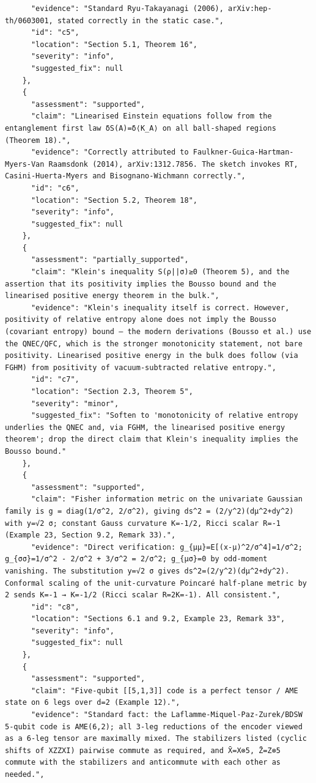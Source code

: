 \documentclass[11pt]{article}
\begin{document}
\begin{verbatim}
      "evidence": "Standard Ryu-Takayanagi (2006), arXiv:hep-th/0603001, stated correctly in the static case.",
      "id": "c5",
      "location": "Section 5.1, Theorem 16",
      "severity": "info",
      "suggested_fix": null
    },
    {
      "assessment": "supported",
      "claim": "Linearised Einstein equations follow from the entanglement first law δS(A)=δ⟨K_A⟩ on all ball-shaped regions (Theorem 18).",
      "evidence": "Correctly attributed to Faulkner-Guica-Hartman-Myers-Van Raamsdonk (2014), arXiv:1312.7856. The sketch invokes RT, Casini-Huerta-Myers and Bisognano-Wichmann correctly.",
      "id": "c6",
      "location": "Section 5.2, Theorem 18",
      "severity": "info",
      "suggested_fix": null
    },
    {
      "assessment": "partially_supported",
      "claim": "Klein's inequality S(ρ||σ)≥0 (Theorem 5), and the assertion that its positivity implies the Bousso bound and the linearised positive energy theorem in the bulk.",
      "evidence": "Klein's inequality itself is correct. However, positivity of relative entropy alone does not imply the Bousso (covariant entropy) bound — the modern derivations (Bousso et al.) use the QNEC/QFC, which is the stronger monotonicity statement, not bare positivity. Linearised positive energy in the bulk does follow (via FGHM) from positivity of vacuum-subtracted relative entropy.",
      "id": "c7",
      "location": "Section 2.3, Theorem 5",
      "severity": "minor",
      "suggested_fix": "Soften to 'monotonicity of relative entropy underlies the QNEC and, via FGHM, the linearised positive energy theorem'; drop the direct claim that Klein's inequality implies the Bousso bound."
    },
    {
      "assessment": "supported",
      "claim": "Fisher information metric on the univariate Gaussian family is g = diag(1/σ^2, 2/σ^2), giving ds^2 = (2/y^2)(dμ^2+dy^2) with y=√2 σ; constant Gauss curvature K=-1/2, Ricci scalar R=-1 (Example 23, Section 9.2, Remark 33).",
      "evidence": "Direct verification: g_{μμ}=E[(x-μ)^2/σ^4]=1/σ^2; g_{σσ}=1/σ^2 - 2/σ^2 + 3/σ^2 = 2/σ^2; g_{μσ}=0 by odd-moment vanishing. The substitution y=√2 σ gives ds^2=(2/y^2)(dμ^2+dy^2). Conformal scaling of the unit-curvature Poincaré half-plane metric by 2 sends K=-1 → K=-1/2 (Ricci scalar R=2K=-1). All consistent.",
      "id": "c8",
      "location": "Sections 6.1 and 9.2, Example 23, Remark 33",
      "severity": "info",
      "suggested_fix": null
    },
    {
      "assessment": "supported",
      "claim": "Five-qubit [[5,1,3]] code is a perfect tensor / AME state on 6 legs over d=2 (Example 12).",
      "evidence": "Standard fact: the Laflamme-Miquel-Paz-Zurek/BDSW 5-qubit code is AME(6,2); all 3-leg reductions of the encoder viewed as a 6-leg tensor are maximally mixed. The stabilizers listed (cyclic shifts of XZZXI) pairwise commute as required, and X̄=X⊗5, Z̄=Z⊗5 commute with the stabilizers and anticommute with each other as needed.",

\end{verbatim}
\end{document}

